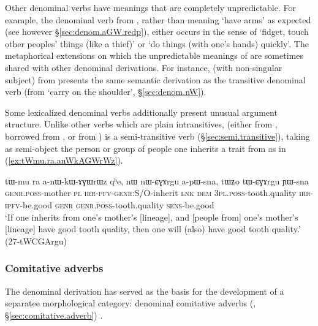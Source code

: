 Other denominal verbs have meanings that are completely unpredictable. For example, the denominal verb  from , rather than meaning `have arms' as expected (see however §\ref{sec:denom.aGW.redp}), either occurs in the sense of `fidget, touch other peoples' things (like a thief)' or `do things (with one's hands) quickly'. The metaphorical extensions on which the unpredictable meanings of  are sometimes shared with other denominal derivations. For instance,  (with non-singular subject) from  presents the same semantic derivation as the transitive denominal verb  (from `carry on the shoulder', §\ref{sec:denom.nW}).

Some lexicalized  denominal verbs additionally present unusual argument structure. Unlike other  verbs which are plain intransitives,  (either from , borrowed from , or from ) is a semi-transitive verb (§\ref{sec:semi.transitive}), taking as semi-object the person or group of people one inherits a trait from as in (\ref{ex:tWmu.ra.anWkAGWrWz}).

\begin{exe}
\ex \label{ex:tWmu.ra.anWkAGWrWz}
\gll tɯ-mu ra a-nɯ-kɯ-ɤɣɯrɯz qʰe, nɯ nɯ-ɕɣɤrgu a-pɯ-sna, tɯʑo tɯ-ɕɣɤrgu ɲɯ-sna \\
\textsc{genr}.\textsc{poss}-mother \textsc{pl} \textsc{irr}-\textsc{pfv}-\textsc{genr}:S/O-inherit \textsc{lnk} \textsc{dem} \textsc{3pl}.\textsc{poss}-tooth.quality \textsc{irr}-\textsc{ipfv}-be.good \textsc{genr} \textsc{genr}.\textsc{poss}-tooth.quality \textsc{sens}-be.good \\
\glt `If one inherits from one's mother's [lineage], and [people from] one's mother's [lineage] have good tooth quality, then one will (also) have good tooth quality.' (27-tWCGArgu)
\end{exe}


 \subsubsection{Comitative adverbs}  \label{sec:denom.aGW.comitative}
The  denominal derivation has served as the basis for the development of a separatee morphological category: denominal comitative adverbs (\citealt{jacques17comitative}, §\ref{sec:comitative.adverb}) .

